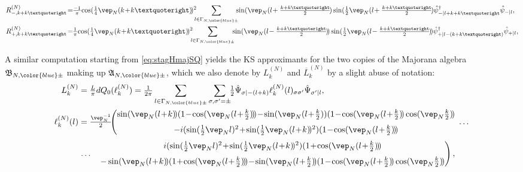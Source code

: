 \documentclass[a4paper, 11pt]{article}
\newcommand{\fA}{\mathfrak{A}}\newcommand{\cA}{\mathcal{A}}\newcommand{\dA}{\mathds{A}}\newcommand{\sA}{\mathscr{A}}
\newcommand{\fB}{\mathfrak{B}}\newcommand{\cB}{\mathcal{B}}\newcommand{\dB}{\mathds{B}}\newcommand{\sB}{\mathscr{B}}
\DeclareMathOperator{\1}{\mathds{1}}
\begin{document}
\begin{align}
\label{eq:latviraR}
R^{(N)}_{-,k+k’} &\!=\!\!\tfrac{-1}{\pi}\!\cos(\tfrac{1}{4}\vep_{N}(k\!+\!k’)\!)^{2}\!\!\!\sum_{l\in\Gamma_{N,{\color{blue}\pm}}}\!\!\!\sin(\vep_{N}(l\!+\tfrac{k+k’}{2}\!)\sin(\tfrac{1}{2}\vep_{N}(l\!+\tfrac{k+k’}{2}\!)\hat{\psi}_{-|l+k+k’}^{\dag}\hat{\psi}_{-|l}, \\ \nonumber
R^{(N)}_{+,k+k’} &\!=\!\!\tfrac{1}{\pi}\!\cos(\tfrac{1}{4}\vep_{N}(k\!+\!k’)\!)^{2}\!\!\!\sum_{l\in\Gamma_{N,{\color{blue}\pm}}}\!\!\!\sin(\vep_{N}(l\!-\tfrac{k+k’}{2}\!)\!)\sin(\tfrac{1}{2}\vep_{N}(l\!-\tfrac{k+k’}{2}\!)\!)\hat{\psi}_{+|l-(k+k’)}^{\dag}\hat{\psi}_{+|l},
\end{align}

A similar computation starting from \eqref{eq:stagHmajSQ} yields the KS approximants for the two copies of the Majorana algebra $\fB_{N,{\color{blue}\pm}}$ making up $\fA_{N,{\color{blue}\pm}}$, which we also denote by $L^{(N)}_{k}$ and $\overline{L}^{(N)}_{k}$ by a slight abuse of notation:
\begin{align}
\label{eq:latviramaj}
L^{(N)}_{k} & = \tfrac{L}{\pi}dQ_{0}(\ell^{(N)}_{k}) = \tfrac{1}{2\pi}\sum_{l\in\Gamma_{N,{\color{blue}\pm}}}\sum_{\sigma,\sigma'=\pm}\!\!\tfrac{1}{2}\hat{\Psi}_{\sigma|-(l+k)}\ell^{(N)}_{k}(l)_{\sigma\sigma'}\hat{\Psi}_{\sigma'|l},\\ \nonumber
\ell^{(N)}_{k}(l) & = \tfrac{\vep_{N}^{-1}}{2}\!\!\left(\begin{matrix} \sin(\vep_{N}(l\!+\!k)\!)(1\!-\!\cos(\vep_{N}(l\!+\!\tfrac{k}{2})\!)\!)\!-\!\sin(\vep_{N}(l\!+\!\tfrac{k}{2}))(1\!-\!\cos(\vep_{N}(l\!+\!\tfrac{k}{2})\!)\cos(\vep_{N}\tfrac{k}{2})\!) &  \\[-0.1cm]  & \!\!\!\dots \\[-0.1cm] -i(\sin(\tfrac{1}{2}\vep_{N}l)^{2}\!+\!\sin(\tfrac{1}{2}\vep_{N}(l\!+\!k)\!)^{2})(1\!-\!\cos(\vep_{N}(l\!+\!\tfrac{k}{2})\!)\!) &  \end{matrix}\right. \\[0.1cm] \nonumber
& \left.\begin{matrix}  & i(\sin(\tfrac{1}{2}\vep_{N}l)^{2}\!+\!\sin(\tfrac{1}{2}\vep_{N}(l\!+\!k)\!)^{2})(1\!+\!\cos(\vep_{N}(l\!+\!\tfrac{k}{2})\!)\!) \\[-0.1cm] \dots &  \\[-0.1cm]  & -\sin(\vep_{N}(l\!+\!k)\!)(1\!+\!\cos(\vep_{N}(l\!+\!\tfrac{k}{2})\!)\!)\!-\!\sin(\vep_{N}(l\!+\!\tfrac{k}{2})\!)(1\!-\!\cos(\vep_{N}(l\!+\!\tfrac{k}{2})\!)\cos(\vep_{N}\tfrac{k}{2})\!)  \end{matrix}\right),
\end{align}
\end{document}
